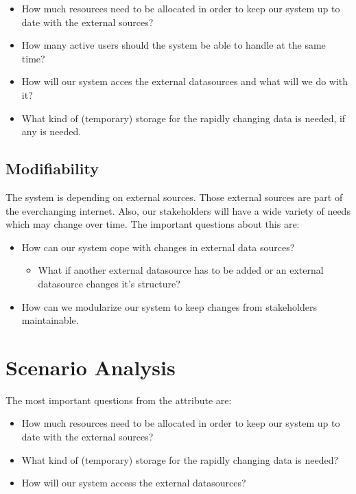 \documentclass{article}
\begin{document}
\begin{itemize}
\item How much resources need to be allocated in order to keep our system up to date with the external sources?
\item How many active users should the system be able to handle at the same time?
\item How will our system acces the external datasources and what will we do with it?
\item What kind of (temporary) storage for the rapidly changing data is needed, if any is needed.
\end{itemize}

\subsection*{Modifiability}
The system is depending on external sources. Those external sources are part of the everchanging internet. Also, our stakeholders will have a wide variety of needs which may change over time. The important questions about this are:

\begin{itemize}
\item How can our system cope with changes in external data sources?  
\begin{itemize}
\item What if another external datasource has to be added or an external datasource changes it's structure?
\end{itemize}
\item How can we modularize our system to keep changes from stakeholders maintainable.
\end{itemize}

\section*{Scenario Analysis}

The most important questions from the attribute are: 
\begin{itemize}
\item How much resources need to be allocated in order to keep our system up to date with the external sources?
\item What kind of (temporary) storage for the rapidly changing data is needed?
\item How will our system access the external datasources?
\end{itemize}
\end{document}
